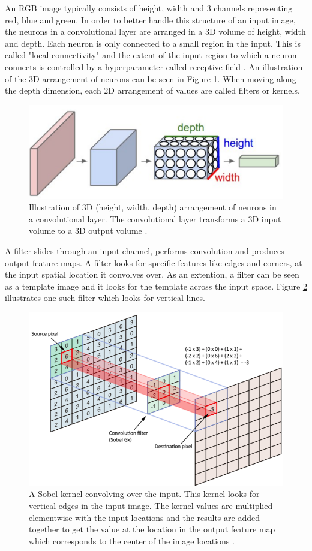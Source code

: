An RGB image typically consists of height, width and 3 channels representing red, blue and green. In order to better handle this structure of an input image, the neurons in a convolutional layer are arranged in a 3D volume of height, width and depth. Each neuron is only connected to a small region in the input. This is called "local connectivity" and the extent of the input region to which a neuron connects is controlled by a hyperparameter called receptive field \cite{cs231n}. An illustration of the 3D arrangement of neurons can be seen in Figure \ref{Fig:cnn_neuron}. When moving along the depth dimension, each 2D arrangement of values are called filters or kernels.

	\begin{figure}[h]
		\centering
		\includegraphics[width=.4\linewidth]{images/conv_3dneurons}
		\caption{Illustration of 3D (height, width, depth) arrangement of neurons in a convolutional layer. The convolutional layer transforms a 3D input volume to a 3D output volume  \cite{cs231n}.}
		\label{Fig:cnn_neuron}
	\end{figure}
	
A filter slides through an input channel, performs convolution and produces output feature maps. A filter looks for specific features like edges and corners, at the input spatial location it convolves over. As an extention, a filter can be seen as a template image and it looks for the template across the input space. Figure \ref{Fig:convolution} illustrates one such filter which looks for vertical lines. 

	\begin{figure}[h]
		\centering
		\includegraphics[width=.8\linewidth]{images/convolution}
		\caption{A Sobel kernel convolving over the input. This kernel looks for vertical edges in the input image. The kernel values are multiplied elementwise with the input locations and the results are added together to get the value at the location in the output feature map which corresponds to the center of the image locations  \cite{freecodecamp}.}
		\label{Fig:convolution}
	\end{figure}
	

